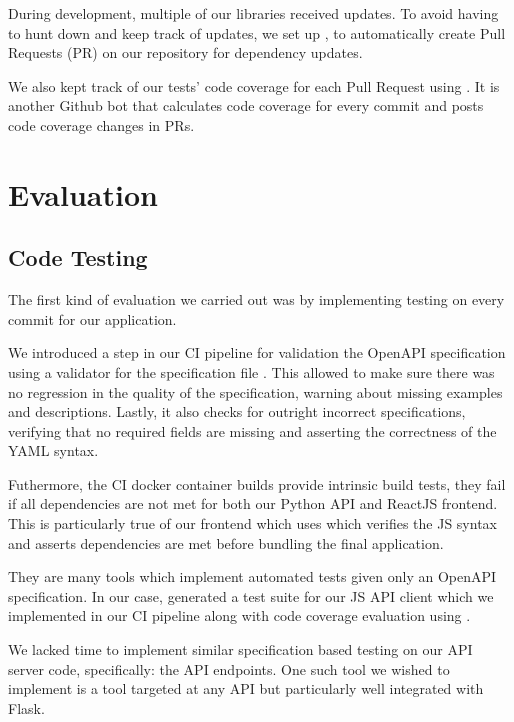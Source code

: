 \documentclass[\version]{l4proj}
\begin{document}
During development, multiple of our libraries received updates.
To avoid having to hunt down and keep track of updates, we set up \textcite{Dependabot2020}, to automatically create Pull Requests (PR) on our repository for dependency updates.

We also kept track of our tests' code coverage for each Pull Request using \textcite{Codecov2020}.
It is another Github bot that calculates code coverage for every commit and posts code coverage changes in PRs.

\chapter{Evaluation}

\section{Code Testing}

The first kind of evaluation we carried out was by implementing testing on every commit for our application.

We introduced a step in our CI pipeline for validation the OpenAPI specification using a validator for the specification file \autocite{IBMOpenapivalidator2020}.
This allowed to make sure there was no regression in the quality of the specification, warning about missing examples and descriptions.
Lastly, it also checks for outright incorrect specifications, verifying that no required fields are missing and asserting the correctness of the YAML syntax.

Futhermore, the CI docker container builds provide intrinsic build tests, they fail if all dependencies are not met for both our Python API and ReactJS frontend.
This is particularly true of our frontend which uses \textcite{ParcelbundlerParcel2020} which verifies the JS syntax and asserts dependencies are met before bundling the final application.

They are many tools which implement automated tests given only an OpenAPI specification.
In our case, \textcite{OpenAPIToolsOpenapigenerator2020} generated a test suite for our JS API client which we implemented in our CI pipeline along with code coverage evaluation using \textcite{Codecov2020}.

We lacked time to implement similar specification based testing on our API server code, specifically: the API endpoints.
One such tool we wished to implement is \textcite{KiwicomSchemathesis2020} a tool targeted at any API but particularly well integrated with Flask.
\end{document}
